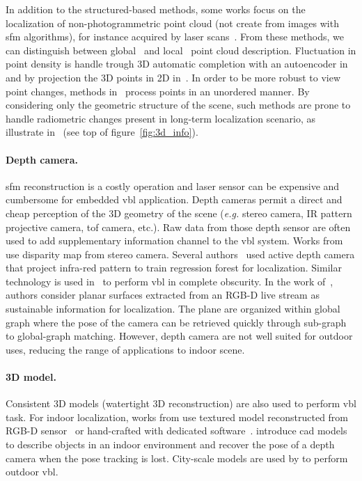 			In addition to the structured-based methods, some works focus on the localization of non-photogrammetric point cloud (\ie not create from images with \ac{sfm} algorithms), for instance acquired by laser scans~\citep{Elbaz2017,Uy2018,Schonberger2017a,Zeng2016,Yew2018,Deng2018}. From these methods, we can distinguish between global~\citep{Uy2018,Schonberger2017a} and local~\citep{Elbaz2017,Zeng2016,Yew2018,Deng2018} point cloud description. Fluctuation in point density is handle trough 3D automatic completion with an autoencoder in~\citep{Schonberger2017a} and by projection the 3D points in 2D in~\citep{Elbaz2017}. In order to be more robust to view point changes, methods in~\citep{Yew2018,Deng2018} process points in an unordered manner. By considering only the geometric structure of the scene, such methods are prone to handle radiometric changes present in long-term localization scenario, as illustrate in~\citep{Schonberger2017a,Uy2018} (see top of figure~\ref{fig:3d_info}).

		\paragraph{Depth camera.}
			\Ac{sfm} reconstruction is a costly operation and laser sensor can be expensive and cumbersome for embedded \ac{vbl} application. Depth cameras permit a direct and cheap perception of the 3D geometry of the scene (\textit{e.g.} stereo camera, IR pattern projective camera, \ac{tof} camera, etc.). Raw data from those depth sensor are often used to add supplementary information channel to the \ac{vbl} system. Works from~\citep{Ni2009,McManus2014,Wan2014} use disparity map from stereo camera. Several authors~\citep{Shotton2013,Guzman-rivera2014,Glocker2015} used active depth camera that project infra-red pattern to train regression forest for localization. Similar technology is used in~\citep{Li2016a} to perform \ac{vbl} in complete obscurity. In the work of~\citep{Fernandez-Moral2013}, authors consider planar surfaces extracted from an RGB-D live stream as sustainable information for localization. The plane are organized within global graph where the pose of the camera can be retrieved quickly through sub-graph to global-graph matching.  However, depth camera are not well suited for outdoor uses, reducing the range of applications to indoor scene.

		\paragraph{3D model.}
			Consistent 3D models (\ie watertight 3D reconstruction) are also used to perform \ac{vbl} task.  For indoor localization, works from \citep{Shotton2013,Pascoe2015,Taira2018,Taira2019} use textured model reconstructed from RGB-D sensor~\citep{Shotton2013} or hand-crafted with dedicated software~\citep{Pascoe2015}. \citet{Salas-Moreno2013} introduce \ac{cad} models to describe objects in an indoor environment and recover the pose of a depth camera when the pose tracking is lost. City-scale models are used by \citep{Aubry2014,Poglitsch2015,Pascoe2015a,Pascoe2015b,Caselitz2016} to perform outdoor \ac{vbl}. 


